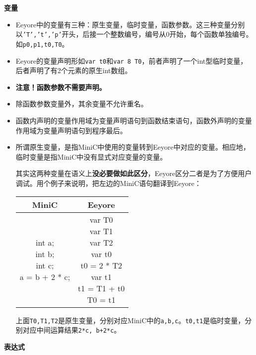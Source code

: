 \noindent \textbf{变量}
\begin{itemize}
\item 
Eeyore中的变量有三种：原生变量，临时变量，函数参数。这三种变量分别以\texttt{'T','t','p'}开头，后接一个整数编号，编号从0开始，每个函数单独编号。如\texttt{p0,p1,t0,T0}。

\item 
Eeyore的变量声明形如\texttt{var t0}和\texttt{var 8 T0}，前者声明了一个int型临时变量，后者声明了有2个元素的原生int数组。

\item
\textbf{注意！函数参数不需要声明。}

\item 
除函数参数变量外，其余变量不允许重名。

\item 
函数内声明的变量作用域为变量声明语句到函数结束语句，函数外声明的变量作用域为变量声明语句到程序最后。

\item 
所谓原生变量，是指MiniC中使用的变量转到Eeyore中对应的变量。相应地，临时变量是指MiniC中没有显式对应变量的变量。

\qquad 其实这两种变量在语义上\textbf{没必要做如此区分}，Eeyore区分二者是为了方便用户调试。用个例子来说明，把左边的MiniC语句翻译到Eeyore：
\begin{table}[H]
    \centering
    \small
    \begin{typewriterfont}
    \begin{tabular}{|c|c|}
        \hline
        MiniC & Eeyore \\
        \hline
        \makecell[l]{int a;\\ int b;\\ int c;\\a = b + 2 * c;} & \makecell[l]{var T0\\var T1\\var T2\\var t0\\t0 = 2 * T2\\var t1\\t1 = T1 + t0\\T0 = t1} \\
        \hline
    \end{tabular}
    \end{typewriterfont}
\end{table}

上面\texttt{T0,T1,T2}是原生变量，分别对应MiniC中的\texttt{a,b,c}。\texttt{t0,t1}是临时变量，分别对应中间运算结果\texttt{2*c, b+2*c}。

\end{itemize}
\noindent \textbf{表达式}

